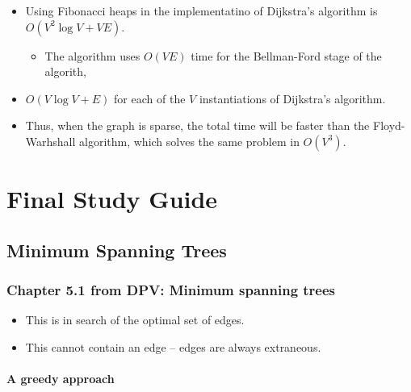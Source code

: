 \documentclass[a4paper,11pt]{article}
\begin{document}
\begin{enumerate}
\begin{itemize}
    \begin{itemize}
    \itemsep1pt\parskip0pt
    \item
      Using Fibonacci heaps in the implementatino of Dijkstra's
      algorithm is $O(V^2 \log V + VE)$.

      \begin{itemize}
      \itemsep1pt\parskip0pt
      \item
        The algorithm uses $O(VE)$ time for the Bellman-Ford stage of
        the algorith,
      \end{itemize}
    \item
      $O(V \log V + E)$ for each of the $V$ instantiations of Dijkstra's
      algorithm.
    \item
      Thus, when the graph is sparse, the total time will be faster than
      the Floyd-Warhshall algorithm, which solves the same problem in
      $O(V^3)$.
    \end{itemize}
  \end{itemize}
\end{enumerate}

\section{Final Study Guide}\label{final-study-guide}

\subsection{Minimum Spanning Trees}\label{minimum-spanning-trees}

\subsubsection{Chapter 5.1 from DPV: Minimum spanning
trees}\label{chapter-5.1-from-dpv-minimum-spanning-trees}

\begin{itemize}
\itemsep1pt\parskip0pt
\item
  This is in search of the optimal set of edges.
\item
  This cannot contain an edge -- edges are always extraneous.
\end{itemize}

\paragraph{A greedy approach}\label{a-greedy-approach}
\end{document}
